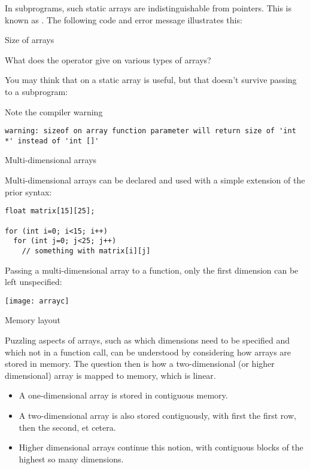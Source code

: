 In subprograms, such static arrays are indistinguishable from pointers.
This is known as .
The following code and error message illustrates this:
%

 {Size of arrays}

What does the  operator give on various types of arrays?


You may think that  on a static array is useful,
but that doesn't survive passing to a subprogram:


Note the compiler warning
\begin{verbatim}
warning: sizeof on array function parameter will return size of 'int *' instead of 'int []'
\end{verbatim}

 {Multi-dimensional arrays}

Multi-dimensional arrays can be declared and used with a simple extension of
the prior syntax:
\begin{lstlisting}
float matrix[15][25];

for (int i=0; i<15; i++)
  for (int j=0; j<25; j++)
    // something with matrix[i][j]
\end{lstlisting}

Passing a multi-dimensional array to a function, only the first
dimension can be left unspecified:
%

\texttt{[image: arrayc]}

 {Memory layout}

Puzzling aspects of arrays, such as which dimensions need to be
specified and which not in a function call, can be understood by
considering how arrays are stored in memory.
The question then is how a two-dimensional (or higher dimensional)
array is mapped to memory, which is linear.
\begin{itemize}
\item A one-dimensional array is stored in contiguous memory.
\item A two-dimensional array is also stored contiguously, with first
  the first row, then the second, et cetera.
\item Higher dimensional arrays continue this notion, with contiguous
  blocks of the highest so many dimensions.
\end{itemize}


